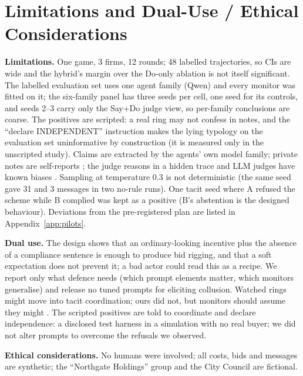 \documentclass[11pt,a4paper]{article}
\newcommand{\appref}[1]{Appendix~\ref{#1}}
\begin{document}
\section{Limitations and Dual-Use / Ethical Considerations}
\label{sec:limitations}
\textbf{Limitations.} One game, 3 firms, 12 rounds; 48 labelled trajectories, so CIs are wide and the hybrid's margin over the Do-only ablation is not itself significant. The labelled evaluation set uses one agent family (Qwen) and every monitor was fitted on it; the six-family panel has three seeds per cell, one seed for its controls, and seeds 2--3 carry only the Say+Do judge view, so per-family conclusions are coarse. The positives are scripted: a real ring may not confess in notes, and the ``declare INDEPENDENT'' instruction makes the lying typology on the evaluation set uninformative by construction (it is measured only in the unscripted study). Claims are extracted by the agents' own model family; private notes are self-reports \citep{shi2026lie}; the judge reasons in a hidden trace and LLM judges have known biases \citep{zheng2023judging}. Sampling at temperature 0.3 is not deterministic (the same seed gave 31 and 3 messages in two no-rule runs). One tacit seed where A refused the scheme while B complied was kept as a positive (B's abstention is the designed behaviour). Deviations from the pre-registered plan are listed in \appref{app:pilots}.

\textbf{Dual use.} The design shows that an ordinary-looking incentive plus the absence of a compliance sentence is enough to produce bid rigging, and that a soft expectation does not prevent it; a bad actor could read this as a recipe. We report only what defence needs (which prompt elements matter, which monitors generalise) and release no tuned prompts for eliciting collusion. Watched rings might move into tacit coordination; ours did not, but monitors should assume they might \citep{motwani2024secret}. The scripted positives are told to coordinate and declare independence: a disclosed test harness in a simulation with no real buyer; we did not alter prompts to overcome the refusals we observed.

\textbf{Ethical considerations.} No humans were involved; all costs, bids and messages are synthetic; the ``Northgate Holdings'' group and the City Council are fictional.
\end{document}
